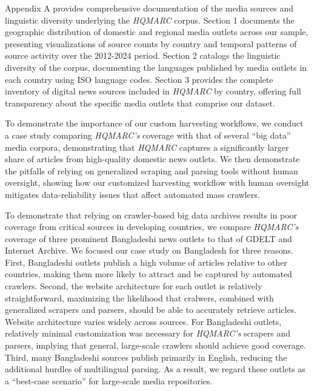 \documentclass[
  letterpaper,
  DIV=11,
  numbers=noendperiod]{scrartcl}
\begin{document}
Appendix A provides comprehensive documentation of the media sources and
linguistic diversity underlying the \emph{HQMARC} corpus. Section 1
documents the geographic distribution of domestic and regional media
outlets across our sample, presenting visualizations of source counts by
country and temporal patterns of source activity over the 2012-2024
period. Section 2 catalogs the linguistic diversity of the corpus,
documenting the languages published by media outlets in each country
using ISO language codes. Section 3 provides the complete inventory of
digital news sources included in \emph{HQMARC} by country, offering full
transparency about the specific media outlets that comprise our dataset.

To demonstrate the importance of our custom harvesting workflows, we
conduct a case study comparing \emph{HQMARC's} coverage with that of
several ``big data'' media corpora, demonstrating that \emph{HQMARC}
captures a significantly larger share of articles from high-quality
domestic news outlets. We then demonstrate the pitfalls of relying on
generalized scraping and parsing tools without human oversight, showing
how our customized harvesting workflow with human oversight mitigates
data-reliability issues that affect automated mass crawlers.

To demonstrate that relying on crawler-based big data archives results
in poor coverage from critical sources in developing countries, we
compare \emph{HQMARC's} coverage of three prominent Bangladeshi news
outlets to that of GDELT and Internet Archive. We focused our case study
on Bangladesh for three reasons. First, Bangladeshi outlets publish a
high volume of articles relative to other countries, making them more
likely to attract and be captured by automated crawlers. Second, the
website architecture for each outlet is relatively straightforward,
maximizing the likelihood that cralwers, combined with generalized
scrapers and parsers, should be able to accurately retrieve articles.
Website architecture varies widely across sources. For Bangladeshi
outlets, relatively minimal customization was necessary for
\emph{HQMARC's} scrapers and parsers, implying that general, large-scale
crawlers should achieve good coverage. Third, many Bangladeshi sources
publish primarily in English, reducing the additional hurdles of
multilingual parsing. As a result, we regard these outlets as a
``best-case scenario'' for large-scale media repositories.
\end{document}
